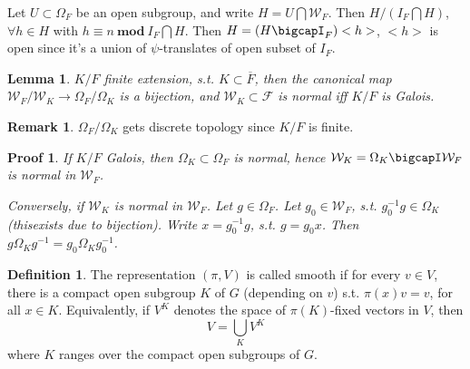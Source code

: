\documentclass[12pt,a4paper,english]{article}
\theoremstyle{definition}
\newtheorem{defi}{Definition}[section]
\newtheorem*{rem}{Remark}
\theoremstyle{plain}
\newtheorem*{lem}{Lemma}
\newtheorem{pf}{Proof}
\begin{document}
Let $U\subset \Omega_{F}$ be an open subgroup, and write $H=U\bigcap\mathcal{W}_{F}$. Then $H/(I_{F}\bigcap H)$, $\forall h\in H$ with $h\equiv n\ \textbf{mod}\ I_{F}\bigcap H$. Then $H=(H\bigcapI_{F})<h>$, $<h>$ is open since it's a union of $\psi$-translates of open subset of $I_{F}$.
\begin{lem}
$K/F$ finite extension, s.t. $K\subset \overline{F}$, then the canonical map $\mathcal{W}_{F}/\mathcal{W}_{K}\rightarrow \Omega_{F}/\Omega_{K}$ is a bijection, and $\mathcal{W}_{K}\subset\mathcal{F}$ is normal iff $K/F$ is Galois.
\end{lem}
\begin{rem}
$\Omega_{F}/\Omega_{K}$ gets discrete topology since $K/F$ is finite.
\end{rem}
\begin{pf}
If $K/F$ Galois, then $\Omega_{K}\subset\Omega_{F}$ is normal, hence $\mathcal{W}_{K}=\Omega_{K}\bigcapI\mathcal{W}_{F}$ is normal in $\mathcal{W}_{F}$.

Conversely, if $\mathcal{W}_{K}$ is normal in $\mathcal{W}_{F}$. Let $g\in\Omega_{F}$. Let $g_{0}\in \mathcal{W}_{F}$, s.t. $g_{0}^{-1}g\in\Omega_{K}$(thisexists due to bijection). Write $x=g^{-1}_{0}g$, s.t. $g=g_{0}x$. Then $g\Omega_{K}g^{-1}=g_{0}\Omega_{K}g_{0}^{-1}$.
\end{pf}
\begin{defi}
The representation $(\pi,V)$ is called smooth if for every $v\in V$, there is a compact open subgroup $K$ of $G$ (depending on $v$) s.t. $\pi(x)v=v$, for all $x\in K$. Equivalently, if $V^{K}$ denotes the space of $\pi(K)$-fixed vectors in $V$, then 
\begin{equation*}
    V=\bigcup\limits_{K}V^{K}
\end{equation*}
where $K$ ranges over the compact open subgroups of $G$.
\end{defi}
\end{document}
